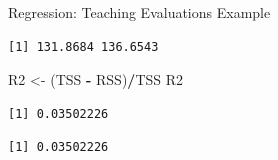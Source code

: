 \documentclass[
  ignorenonframetext,
]{beamer}
\newenvironment{Shaded}{\begin{snugshade}}{\end{snugshade}}
\newcommand{\CommentTok}[1]{\textcolor[rgb]{0.56,0.35,0.01}{\textit{#1}}}
\newcommand{\DecValTok}[1]{\textcolor[rgb]{0.00,0.00,0.81}{#1}}
\newcommand{\FunctionTok}[1]{\textcolor[rgb]{0.13,0.29,0.53}{\textbf{#1}}}
\newcommand{\NormalTok}[1]{#1}
\newcommand{\OtherTok}[1]{\textcolor[rgb]{0.56,0.35,0.01}{#1}}
\newcommand{\SpecialCharTok}[1]{\textcolor[rgb]{0.81,0.36,0.00}{\textbf{#1}}}
\begin{document}
\begin{frame}[fragile]{Regression: Teaching Evaluations Example}
\label{regression-teaching-evaluations-example-14}
\normalsize

\begin{Shaded}
\end{Shaded}

\begin{verbatim}
[1] 131.8684 136.6543
\end{verbatim}

\begin{Shaded}
\begin{Highlighting}[]
\NormalTok{R2 }\OtherTok{\textless{}{-}}\NormalTok{ (TSS }\SpecialCharTok{{-}}\NormalTok{ RSS)}\SpecialCharTok{/}\NormalTok{TSS}
\NormalTok{R2}
\end{Highlighting}
\end{Shaded}

\begin{verbatim}
[1] 0.03502226
\end{verbatim}

\begin{Shaded}
\end{Shaded}

\begin{verbatim}
[1] 0.03502226
\end{verbatim}

\normalsize
\end{frame}
\end{document}
